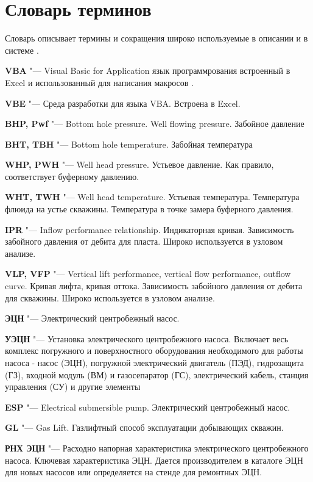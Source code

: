 \chapter*{Словарь терминов}             %

Словарь описывает термины и сокращения широко используемые в описании и в системе \unf.


\textbf{VBA} "--- Visual Basic for Application язык программрования встроенный в Excel и использованный для написания макросов \unf.

\textbf{VBE} "--- Среда разработки для языка VBA. Встроена в Excel.

\textbf{BHP, Pwf} "--- Bottom hole pressure. Well flowing pressure. Забойное давление

\textbf{BHT, TBH} "--- Bottom hole temperature. Забойная температура

\textbf{WHP, PWH} "--- Well head pressure. Устьевое давление. Как правило, соответствует буферному давлению.

\textbf{WHT, TWH} "--- Well head temperature. Устьевая температура. Температура флюида на устье скважины. Температура в точке замера буферного давления.

\textbf{IPR} "--- Inflow performance relationship. Индикаторная кривая. Зависимость забойного давления от дебита для пласта. Широко используется в узловом анализе.

\textbf{VLP, VFP} "--- Vertical lift performance, vertical flow performance, outflow curve. Кривая лифта, кривая оттока. Зависимость забойного давления от дебита для скважины. Широко используется в узловом анализе.


\textbf{ЭЦН} "--- Электрический центробежный насос.

\textbf{УЭЦН} "--- Установка электрического центробежного насоса. Включает весь комплекс погружного и поверхностного оборудования необходимого для работы насоса - насос (ЭЦН), погружной электрический двигатель (ПЭД), гидрозащита (ГЗ), входной модуль (ВМ) и газосепаратор (ГС), электрический кабель, станция управления (СУ) и другие элементы

\textbf{ESP} "--- Electrical submersible pump. Электрический центробежный насос.

\textbf{GL} "--- Gas Lift. Газлифтный способ эксплуатации добывающих скважин. 

\textbf{РНХ ЭЦН} "--- Расходно напорная характеристика электрического центробежного насоса. Ключевая характеристика ЭЦН. Дается производителем в каталоге ЭЦН для новых насосов или определяется на стенде для ремонтных ЭЦН. 

